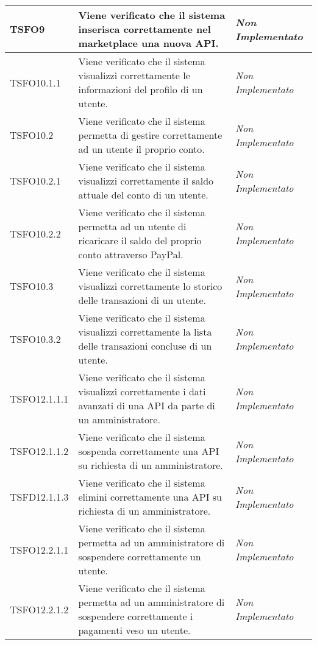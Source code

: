 \begin{longtable}{|>{\centering\arraybackslash}p{2.3cm}|>{\centering\arraybackslash}p{7.5cm} | >{\centering\arraybackslash}p{3.8cm}|}
		\hypertarget{TSFO9}{TSFO9} & Viene verificato che il sistema inserisca correttamente nel marketplace una nuova API. & \textit{Non Implementato}\\ \hline
		\hypertarget{TSFO10.1.1}{TSFO10.1.1} & Viene verificato che il sistema visualizzi correttamente le informazioni del profilo di un utente. & \textit{Non Implementato}\\ \hline
		\hypertarget{TSFO10.2}{TSFO10.2} & Viene verificato che il sistema permetta di gestire correttamente ad un utente il proprio conto. & \textit{Non Implementato}\\ \hline
		\hypertarget{TSFO10.2.1}{TSFO10.2.1} & Viene verificato che il sistema visualizzi correttamente il saldo attuale del conto di un utente. & \textit{Non Implementato}\\ \hline
		\hypertarget{TSFO10.2.2}{TSFO10.2.2} & Viene verificato che il sistema permetta ad un utente di ricaricare il saldo del proprio conto attraverso PayPal. & \textit{Non Implementato}\\ \hline
		\hypertarget{TSFO10.3}{TSFO10.3} & Viene verificato che il sistema visualizzi correttamente lo storico delle transazioni di un utente. & \textit{Non Implementato}\\ \hline
		\hypertarget{TSFO10.3.2}{TSFO10.3.2} & Viene verificato che il sistema visualizzi correttamente la lista delle transazioni concluse di un utente. & \textit{Non Implementato}\\ \hline
		\hypertarget{TSFO12.1.1.1}{TSFO12.1.1.1} & Viene verificato che il sistema visualizzi correttamente i dati avanzati di una API da parte di un amministratore. & \textit{Non Implementato}\\ \hline
		\hypertarget{TSFO12.1.1.2}{TSFO12.1.1.2} & Viene verificato che il sistema sospenda correttamente una API su richiesta di un amministratore. & \textit{Non Implementato}\\ \hline
		\hypertarget{TSFD12.1.1.3}{TSFD12.1.1.3} & Viene verificato che il sistema elimini correttamente una API su richiesta di un amministratore. & \textit{Non Implementato}\\ \hline
		\hypertarget{TSFO12.2.1.1}{TSFO12.2.1.1} & Viene verificato che il sistema permetta ad un amministratore di sospendere correttamente un utente. & \textit{Non Implementato}\\ \hline
		\hypertarget{TSFO12.2.1.2}{TSFO12.2.1.2} & Viene verificato che il sistema permetta ad un amministratore di sospendere correttamente i pagamenti veso un utente. & \textit{Non Implementato}\\ \hline

\end{longtable}
